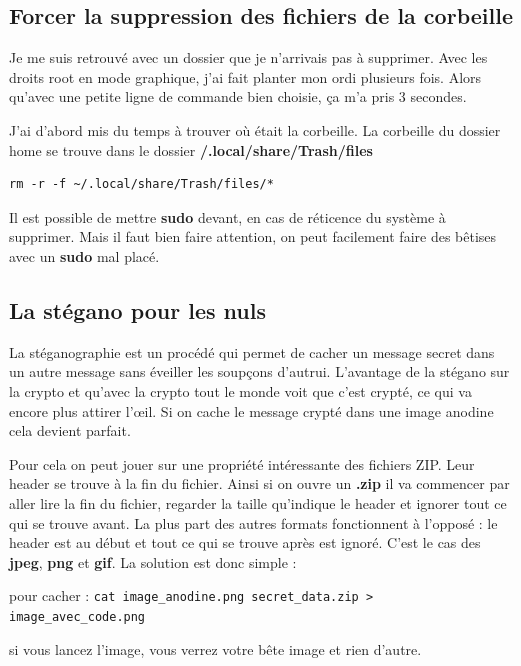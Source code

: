 \documentclass[a4paper,twoside]{article}
\begin{document}
\subsection{Forcer la suppression des fichiers de la corbeille}
Je me suis retrouvé avec un dossier que je n'arrivais pas à supprimer. Avec les droits root en mode graphique, j'ai fait planter mon ordi plusieurs fois. Alors qu'avec une petite ligne de commande bien choisie, ça m'a pris 3 secondes.

J'ai d'abord mis du temps à trouver où était la corbeille. La corbeille du dossier home se trouve dans le dossier \textbf{\texttildelow/.local/share/Trash/files}

\begin{verbatim}
rm -r -f ~/.local/share/Trash/files/*
\end{verbatim}

\begin{remarque}
Il est possible de mettre \textbf{sudo} devant, en cas de réticence du système à supprimer. Mais il faut bien faire attention, on peut facilement faire des bêtises avec un \textbf{sudo} mal placé.
\end{remarque}

\subsection{La stégano pour les nuls}
La stéganographie est un procédé qui permet de cacher un message \og secret \fg   dans un autre message sans éveiller les soupçons d'autrui. L'avantage de la stégano sur la crypto et qu'avec la crypto tout le monde voit que c'est crypté, ce qui va encore plus attirer l'\oe il. Si on cache le message crypté dans une image anodine cela devient parfait.

Pour cela on peut jouer sur une propriété intéressante des fichiers ZIP. Leur \og header \fg  se trouve à la fin du fichier. Ainsi si on ouvre un \textbf{.zip} il va commencer par aller lire la fin du fichier, regarder la taille qu'indique le header et ignorer tout ce qui se trouve avant. La plus part des autres formats fonctionnent à l'opposé : le header est au début et tout ce qui se trouve après est ignoré. C'est le cas des \textbf{jpeg}, \textbf{png} et \textbf{gif}. La solution est donc simple :

pour \og cacher \fg   : \verb|cat image_anodine.png secret_data.zip > image_avec_code.png|

si vous \og lancez \fg   l'image, vous verrez votre bête image et rien d'autre.
\end{document}
